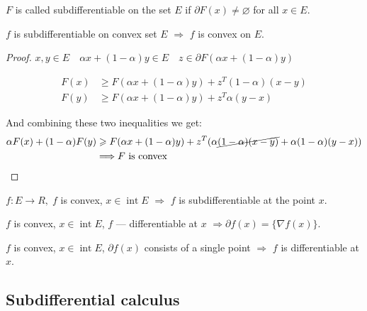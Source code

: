 \begin{conj}
    $F$ is called subdifferentiable on the set $E$ if $\partial F(x) \neq \varnothing$ for all $x \in E$.
\end{conj}

\begin{theorem}
    $f$ is subdifferentiable on convex set $E$ $\Longrightarrow$ $f$ is convex on $E$.
\end{theorem}
\begin{proof}
    $x, y \in E \quad \alpha x + (1 - \alpha) y \in E \quad z \in \partial F(\alpha x + (1 - \alpha) y)$

    \begin{align*}
        F(x) &\geqslant F(\alpha x + (1 - \alpha) y) + z^T(1 - \alpha) (x - y)\\
        F(y) &\geqslant F(\alpha x + (1 - \alpha) y) + z^T \alpha (y - x)
    \end{align*}

    And combining these two inequalities we get:
    \begin{align*}
        \alpha F(x) + (1 - \alpha) F(y) &\geqslant F(\alpha x + (1 - \alpha) y) + z^T(\alpha \cancel{(1 - \alpha) (x - y)} + \alpha (1 - \alpha) (y - x)) \\
        &\Longrightarrow F \text{ is convex}
    \end{align*}
\end{proof}

\begin{lemma}
    $f : E \to R, \; f$ is convex, $x \in \operatorname{int} E$ $\Longrightarrow$ $f$ is subdifferentiable at the point $x$. 
\end{lemma}

\begin{lemma}
    $f$ is convex, $x \in \operatorname{int} E$, $f$ --- differentiable at $x$ $\Longrightarrow \partial f(x) = \{ \nabla f(x) \}$. 
\end{lemma}

\begin{lemma}
    $f$ is convex, $x \in \operatorname{int} E$, $\partial f(x)$ consists of a single point $\Longrightarrow$ $f$ is differentiable at $x$.
\end{lemma}

\subsection{Subdifferential calculus}

